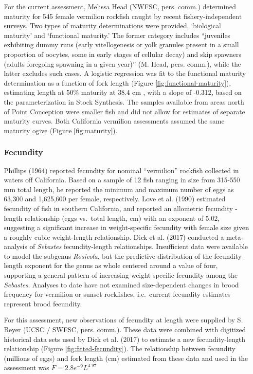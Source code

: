 \documentclass[
  english,
  a4paper,
]{article}
\begin{document}
For the current assessment, Melissa Head (NWFSC, pers. comm.) determined maturity
for 545 female vermilion rockfish caught by recent fishery-independent surveys. Two types
of maturity determinations were provided, `biological maturity' and `functional
maturity.' The former category includes ``juveniles exhibiting dummy runs (early
vitellogenesis or yolk granules present in a small proportion of oocytes, some
in early stages of cellular decay) and skip spawners (adults foregoing spawning
in a given year)'' (M. Head, pers. comm.), while the latter excludes such cases.
A logistic regression was fit to the functional maturity determination as a
function of fork length (Figure \ref{fig:functional-maturity}), estimating
length at 50\% maturity at 38.4 cm , with a slope of -0.312,
based on the parameterization in Stock Synthesis. The samples available from
areas north of Point Conception were smaller fish and did not allow for estimates
of separate maturity curves. Both California vermilion assessments assumed the
same maturity
ogive (Figure \ref{fig:maturity}).

\hypertarget{fecundity}{%
\subsubsection{Fecundity}\label{fecundity}}

Phillips (1964) reported fecundity for nominal ``vermilion'' rockfish collected in waters off California. Based on a sample of 12 fish ranging in size from 315-550 mm total length, he reported the minimum and maximum number of eggs as 63,300 and 1,625,600 per female, respectively. Love et al. (1990) estimated fecundity of fish in southern California, and reported an allometric fecundity - length relationship (eggs vs.~total length, cm) with an exponent of 5.02, suggesting a significant increase in weight-specific fecundity with female size given a roughly cubic weight-length relationship. Dick et al. (2017) conducted a meta-analysis of \emph{Sebastes} fecundity-length relationships. Insufficient data were available to model the subgenus \emph{Rosicola}, but the predictive distribution of the fecundity-length exponent for the genus as whole centered around a value of four, supporting a general pattern of increasing weight-specific fecundity among the \emph{Sebastes}. Analyses to date have not examined size-dependent changes in brood frequency for vermilion or sunset rockfishes, i.e.~current fecundity estimates represent brood fecundity.

For this assessment, new observations of fecundity at length were supplied by S. Beyer (UCSC / SWFSC, pers. comm.). These data were combined with digitized historical data sets used by Dick et al. (2017) to estimate a new fecundity-length relationship (Figure \ref{fig:fitted-fecundity}). The relationship between fecundity (millions of eggs) and fork length (cm) estimated from these data and used in the assessment was
\(F = 2.8e^{-9}L^{4.97}\)
\end{document}
